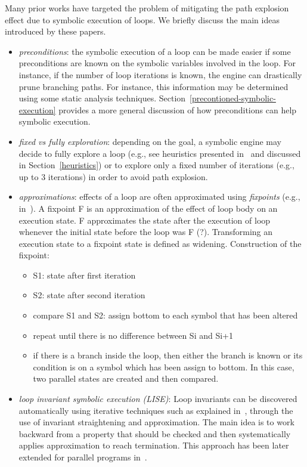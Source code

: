 Many prior works have targeted the problem of mitigating the path explosion effect due to symbolic execution of loops. We briefly discuss the main ideas introduced by these papers. 
\begin{itemize}

  \item {\em preconditions}: the symbolic execution of a loop can be made easier if some preconditions are known on the symbolic variables involved in the loop. For instance, if the number of loop iterations is known, the engine can drastically prune branching paths. For instance, this information may be determined using some static analysis techniques. Section~\ref{precontioned-symbolic-execution} provides a more general discussion of how preconditions can help symbolic execution.

  \item {\em fixed vs fully exploration}: depending on the goal, a symbolic engine may decide to fully explore a loop (e.g., see heuristics presented in~\cite{AEG-NDSS11} and discussed in Section~\ref{heuristics}) or to explore only a fixed number of iterations (e.g., up to 3 iterations) in order to avoid path explosion.

  \item {\em approximations}: effects of a loop are often approximated using {\em fixpoints} (e.g., in~\cite{KKM-USEC05,BNS-SP06,CFB-ACSAC06}). A fixpoint F is an approximation of the effect of loop body on an execution state. F approximates the state after the execution of loop whenever the initial state before the loop was F (?). Transforming an execution state to a fixpoint state is defined as widening. Construction of the fixpoint:
  \begin{itemize}
    \item S1: state after first iteration
    \item S2: state after second iteration
    \item compare S1 and S2: assign bottom to each symbol that has been altered
    \item repeat until there is no difference between Si and Si+1
    \item if there is a branch inside the loop, then either the branch is known or its condition is on a symbol which has been assign to bottom. In this case, two parallel states are created and then compared.
  \end{itemize}

  \item {\em loop invariant symbolic execution (LISE)}: Loop invariants can be discovered automatically using iterative techniques such as explained in~\cite{PV-SPIN04}, through the use of invariant straightening and approximation. The main idea is to work backward from a property that should be checked and then systematically applies approximation to reach termination. This approach has been later extended for parallel programs in~\cite{SZ-VMCAI12}.


\end{itemize}

